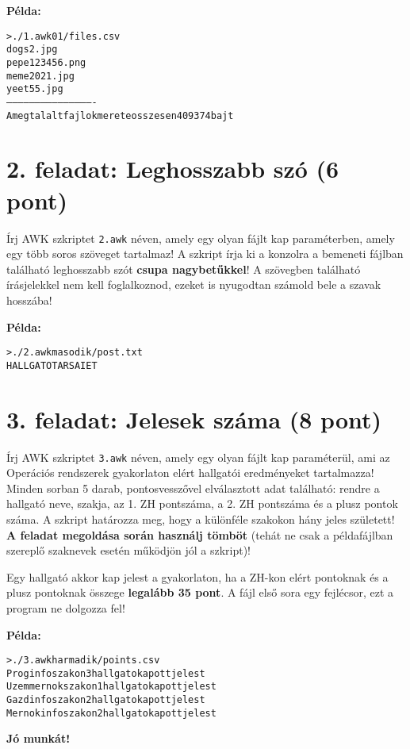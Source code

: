 \documentclass[a4paper,12pt]{article}
\begin{document}
\textbf{Példa:}

\begin{alltt}
> ./1.awk 01/files.csv
dogs2.jpg 
pepe123456.png 
meme2021.jpg 
yeet55.jpg 
---------------------------------------------- 
A megtalalt fajlok merete osszesen 409374 bajt
\end{alltt}

\section*{2. feladat: Leghosszabb szó (6 pont)}

Írj AWK szkriptet \texttt{2.awk} néven, amely egy olyan fájlt kap paraméterben, amely egy több soros szöveget tartalmaz! A szkript írja ki a konzolra a bemeneti fájlban található leghosszabb szót \textbf{csupa nagybetűkkel}! A szövegben található írásjelekkel nem kell foglalkoznod, ezeket is nyugodtan számold bele a szavak hosszába!

\textbf{Példa:}
\begin{alltt}
> ./2.awk masodik/post.txt
HALLGATOTARSAIET
\end{alltt}

\section*{3. feladat: Jelesek száma (8 pont)}

Írj AWK szkriptet \texttt{3.awk} néven, amely egy olyan fájlt kap paraméterül, ami az Operációs rendszerek gyakorlaton elért hallgatói eredményeket tartalmazza! Minden sorban 5 darab, pontosvesszővel elválasztott adat található: rendre a hallgató neve, szakja, az 1. ZH pontszáma, a 2. ZH pontszáma és a plusz pontok száma. A szkript határozza meg, hogy a különféle szakokon hány jeles született! \textbf{A feladat megoldása során használj tömböt} (tehát ne csak a példafájlban szereplő szaknevek esetén működjön jól a szkript)!

Egy hallgató akkor kap jelest a gyakorlaton, ha a ZH-kon elért pontoknak és a plusz pontoknak összege \textbf{legalább 35 pont}. A fájl első sora egy fejlécsor, ezt a program ne dolgozza fel!

\textbf{Példa:}
\begin{alltt}
> ./3.awk harmadik/points.csv
Proginfo szakon 3 hallgato kapott jelest 
Uzemmernok szakon 1 hallgato kapott jelest 
Gazdinfo szakon 2 hallgato kapott jelest 
Mernokinfo szakon 2 hallgato kapott jelest
\end{alltt}

\textbf{Jó munkát!}
\end{document}
